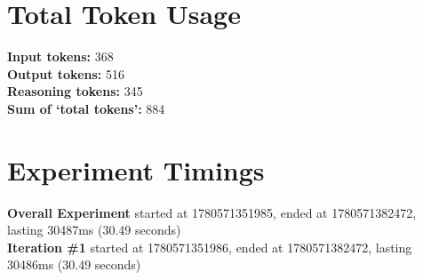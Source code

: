 \documentclass{article}
\begin{document}
\section*{Total Token Usage}
\textbf{Input tokens: }368
\\\textbf{Output tokens: }516
\\\textbf{Reasoning tokens: }345
\\\textbf{Sum of `total tokens': }884
\section*{Experiment Timings}
\textbf{Overall Experiment} started at 1780571351985, ended at 1780571382472, lasting 30487ms (30.49 seconds)
\\\textbf{Iteration \#1} started at 1780571351986, ended at 1780571382472, lasting 30486ms (30.49 seconds)
\end{document}

